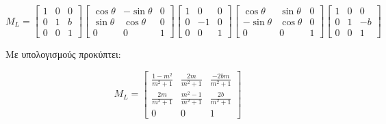 \begin{solution}
\[
M_L = \begin{bmatrix}
1 & 0 & 0 \\
0 & 1 & b \\
0 & 0 & 1
\end{bmatrix}
\begin{bmatrix}
\cos\theta & -\sin\theta & 0 \\
\sin\theta & \cos\theta & 0 \\
0 & 0 & 1
\end{bmatrix}
\begin{bmatrix}
1 & 0 & 0 \\
0 & -1 & 0 \\
0 & 0 & 1
\end{bmatrix}
\begin{bmatrix}
\cos\theta & \sin\theta & 0 \\
-\sin\theta & \cos\theta & 0 \\
0 & 0 & 1
\end{bmatrix}
\begin{bmatrix}
1 & 0 & 0 \\
0 & 1 & -b \\
0 & 0 & 1
\end{bmatrix}
\]

Με υπολογισμούς προκύπτει:

\[
M_L = \begin{bmatrix}
\frac{1 - m^2}{m^2 + 1} & \frac{2m}{m^2 + 1} & \frac{-2bm}{m^2 + 1} \\
\frac{2m}{m^2 + 1} & \frac{m^2 - 1}{m^2 + 1} & \frac{2b}{m^2 + 1} \\
0 & 0 & 1
\end{bmatrix}
\]
\end{solution}